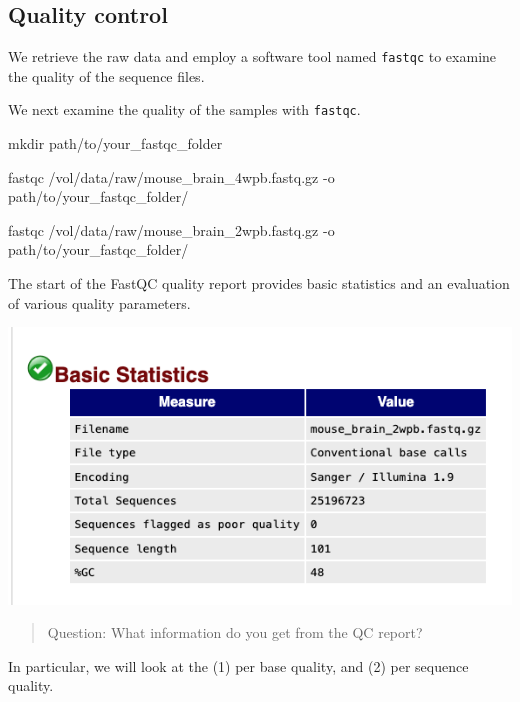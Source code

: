 \documentclass[
]{book}
\newenvironment{Shaded}{\begin{snugshade}}{\end{snugshade}}
\newcommand{\NormalTok}[1]{#1}
\begin{document}
\hypertarget{quality-control}{%
\subsection{Quality control}\label{quality-control}}

We retrieve the raw data and employ a software tool named \texttt{fastqc} to examine the quality of the sequence files.

We next examine the quality of the samples with \texttt{fastqc}.

\begin{Shaded}
\begin{Highlighting}[]
\NormalTok{mkdir path/to/your\_fastqc\_folder}

\NormalTok{fastqc /vol/data/raw/mouse\_brain\_4wpb.fastq.gz {-}o path/to/your\_fastqc\_folder/}

\NormalTok{fastqc /vol/data/raw/mouse\_brain\_2wpb.fastq.gz {-}o path/to/your\_fastqc\_folder/}
\end{Highlighting}
\end{Shaded}

The start of the FastQC quality report provides basic statistics and an evaluation of various quality parameters.

\includegraphics{figures/fastqc_statistics.png}

\begin{quote}
Question: What information do you get from the QC report?
\end{quote}

In particular, we will look at the (1) per base quality, and (2) per sequence quality.
\end{document}
